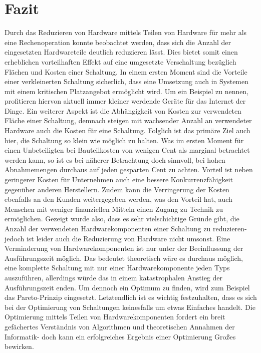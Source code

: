 \documentclass[conference]{IEEEtran}
\begin{document}
\section{Fazit}
Durch das Reduzieren von Hardware mittels Teilen
von Hardware für mehr als eine Rechenoperation konnte
beobachtet werden, dass sich die Anzahl der eingesetzten
Hardwareteile deutlich reduzieren lässt. Dies bietet somit
einen erheblichen vorteilhaften Effekt auf eine umgesetzte
Verschaltung bezüglich Flächen und Kosten einer Schaltung.
In einem ersten Moment sind die Vorteile einer verkleinerten
Schaltung sicherlich, dass eine Umsetzung auch in Systemen
mit einem kritischen Platzangebot ermöglicht wird. Um ein
Beispiel zu nennen, profitieren hiervon aktuell immer kleiner
werdende Geräte für das Internet der Dinge. Ein weiterer Aspekt
ist die Abhängigkeit von Kosten zur verwendeten Fläche
einer Schaltung, demnach steigen mit wachsender Anzahl an
verwendeter Hardware auch die Kosten für eine Schaltung.
Folglich ist das primäre Ziel auch hier, die Schaltung so
klein wie möglich zu halten. Was im ersten Moment für
einen Unbeteiligten bei Bauteilkosten von wenigen Cent als
marginal betrachtet werden kann, so ist es bei näherer Betrachtung doch sinnvoll,
bei hohen Abnahmemengen durchaus auf jeden gesparten
Cent zu achten. Vorteil ist neben geringerer Kosten für Unternehmen
auch eine bessere Konkurrenzfähigkeit gegenüber
anderen Herstellern. Zudem kann die Verringerung der Kosten
ebenfalls an den Kunden weitergegeben werden, was den
Vorteil hat, auch Menschen mit weniger finanziellen Mitteln
einen Zugang zu Technik zu ermöglichen.
Gezeigt wurde also, dass es sehr vielschichtige Gründe gibt,
die Anzahl der verwendeten Hardwarekomponenten einer
Schaltung zu reduzieren- jedoch ist leider auch die Reduzierung
von Hardware nicht umsonst. Eine Verminderung von Hardwarekomponenten
ist nur unter der Beeinflussung der Ausführungszeit
möglich. Das bedeutet theoretisch wäre es durchaus
möglich, eine komplette Schaltung mit nur einer Hardwarekomponente
jeden Typs auszuführen, allerdings würde
das in einem katastrophalen Anstieg der Ausführungszeit
enden. Um dennoch ein Optimum zu finden, wird zum Beispiel
das Pareto-Prinzip eingesetzt.
Letztendlich ist es wichtig festzuhalten, dass es sich bei der
Optimierung von Schaltungen keinesfalls um etwas Einfaches
handelt. Die Optimierung mittels Teilen von Hardwarekomponenten
fordert ein breit gefächertes Verständnis von Algorithmen
und theoretischen Annahmen der Informatik- doch
kann ein erfolgreiches Ergebnis einer Optimierung Großes
bewirken.
\end{document}
